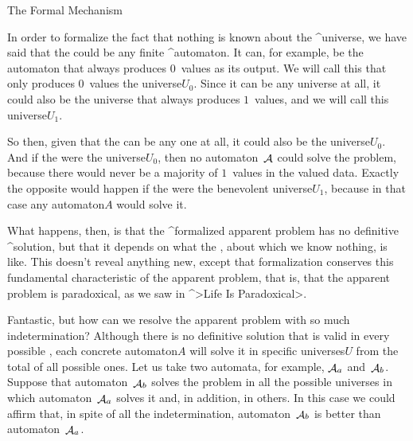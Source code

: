 \Section The Formal Mechanism

In order to formalize the fact that nothing is known about the
^{universe}, we have said that the {\universe} could be any finite
^{automaton}. It can, for example, be the automaton that always produces
$0$~values as its output. We will call this {\universe} that only
produces $0$~values the \corporal universe$U_0$. Since it can be any
universe at all, it could also be the universe that always produces
$1$~values, and we will call this \corporal universe$U_1$.

So then, given that the {\universe} can be any one at all, it could also
be the \corporal universe$U_0$. And if the {\universe} were the
\corporal universe$U_0$, then no automaton~$\aut A$ could solve the
problem, because there would never be a majority of $1$~values in the
valued data. Exactly the opposite would happen if the {\universe} were
the benevolent \corporal universe$U_1$, because in that case any
\corporal automaton$A$ would solve it.

What happens, then, is that the ^{formalized apparent problem} has no
definitive ^{solution}, but that it depends on what the {\universe},
about which we know nothing, is like. This doesn't reveal anything new,
except that formalization conserves this fundamental characteristic of
the apparent problem, that is, that the apparent problem is paradoxical,
as we saw in ^>Life Is Paradoxical>.

Fantastic, but how can we resolve the apparent problem with so much
indetermination? Although there is no definitive solution that is valid
in every possible {\universe}, each concrete \corporal automaton$A$ will
solve it in specific \corporal universes$U$ from the total of all
possible ones. Let us take two automata, for example, $\aut A_a$
and~$\aut A_b$. Suppose that automaton~$\aut A_b$ solves the problem in
all the possible universes in which automaton~$\aut A_a$ solves it and,
in addition, in others. In this case we could affirm that, in spite of
all the indetermination, automaton~$\aut A_b$ is better than
automaton~$\aut A_a$.


